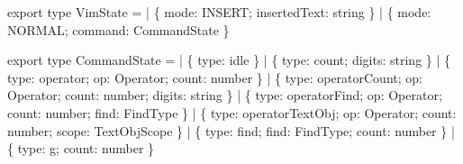 \documentclass[
  english,
  11pt,
  letterpaper,
]{book}
\newenvironment{Shaded}{\begin{snugshade}}{\end{snugshade}}
\newcommand{\DataTypeTok}[1]{\textcolor[rgb]{0.68,0.00,0.00}{#1}}
\newcommand{\ImportTok}[1]{\textcolor[rgb]{0.00,0.46,0.62}{#1}}
\newcommand{\NormalTok}[1]{\textcolor[rgb]{0.00,0.23,0.31}{#1}}
\newcommand{\OperatorTok}[1]{\textcolor[rgb]{0.37,0.37,0.37}{#1}}
\newcommand{\StringTok}[1]{\textcolor[rgb]{0.13,0.47,0.30}{#1}}
\begin{document}
\begin{Shaded}
\begin{Highlighting}[]
\ImportTok{export type}\NormalTok{ VimState }\OperatorTok{=}
  \OperatorTok{|}\NormalTok{ \{ mode}\OperatorTok{:} \StringTok{\textquotesingle{}INSERT\textquotesingle{}}\OperatorTok{;}\NormalTok{ insertedText}\OperatorTok{:} \DataTypeTok{string}\NormalTok{ \}}
  \OperatorTok{|}\NormalTok{ \{ mode}\OperatorTok{:} \StringTok{\textquotesingle{}NORMAL\textquotesingle{}}\OperatorTok{;}\NormalTok{ command}\OperatorTok{:}\NormalTok{ CommandState \}}

\ImportTok{export type}\NormalTok{ CommandState }\OperatorTok{=}
  \OperatorTok{|}\NormalTok{ \{ type}\OperatorTok{:} \StringTok{\textquotesingle{}idle\textquotesingle{}}\NormalTok{ \}}
  \OperatorTok{|}\NormalTok{ \{ type}\OperatorTok{:} \StringTok{\textquotesingle{}count\textquotesingle{}}\OperatorTok{;}\NormalTok{ digits}\OperatorTok{:} \DataTypeTok{string}\NormalTok{ \}}
  \OperatorTok{|}\NormalTok{ \{ type}\OperatorTok{:} \StringTok{\textquotesingle{}operator\textquotesingle{}}\OperatorTok{;}\NormalTok{ op}\OperatorTok{:}\NormalTok{ Operator}\OperatorTok{;}\NormalTok{ count}\OperatorTok{:} \DataTypeTok{number}\NormalTok{ \}}
  \OperatorTok{|}\NormalTok{ \{ type}\OperatorTok{:} \StringTok{\textquotesingle{}operatorCount\textquotesingle{}}\OperatorTok{;}\NormalTok{ op}\OperatorTok{:}\NormalTok{ Operator}\OperatorTok{;}\NormalTok{ count}\OperatorTok{:} \DataTypeTok{number}\OperatorTok{;}\NormalTok{ digits}\OperatorTok{:} \DataTypeTok{string}\NormalTok{ \}}
  \OperatorTok{|}\NormalTok{ \{ type}\OperatorTok{:} \StringTok{\textquotesingle{}operatorFind\textquotesingle{}}\OperatorTok{;}\NormalTok{ op}\OperatorTok{:}\NormalTok{ Operator}\OperatorTok{;}\NormalTok{ count}\OperatorTok{:} \DataTypeTok{number}\OperatorTok{;}\NormalTok{ find}\OperatorTok{:}\NormalTok{ FindType \}}
  \OperatorTok{|}\NormalTok{ \{ type}\OperatorTok{:} \StringTok{\textquotesingle{}operatorTextObj\textquotesingle{}}\OperatorTok{;}\NormalTok{ op}\OperatorTok{:}\NormalTok{ Operator}\OperatorTok{;}\NormalTok{ count}\OperatorTok{:} \DataTypeTok{number}\OperatorTok{;}\NormalTok{ scope}\OperatorTok{:}\NormalTok{ TextObjScope \}}
  \OperatorTok{|}\NormalTok{ \{ type}\OperatorTok{:} \StringTok{\textquotesingle{}find\textquotesingle{}}\OperatorTok{;}\NormalTok{ find}\OperatorTok{:}\NormalTok{ FindType}\OperatorTok{;}\NormalTok{ count}\OperatorTok{:} \DataTypeTok{number}\NormalTok{ \}}
  \OperatorTok{|}\NormalTok{ \{ type}\OperatorTok{:} \StringTok{\textquotesingle{}g\textquotesingle{}}\OperatorTok{;}\NormalTok{ count}\OperatorTok{:} \DataTypeTok{number}\NormalTok{ \}}

\end{Highlighting}
\end{Shaded}
\end{document}
